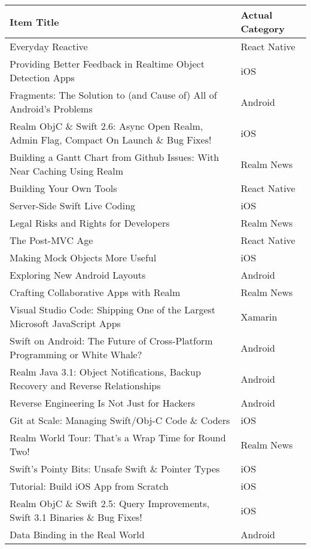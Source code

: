 \documentclass[letterpaper,11pt]{article}
\begin{document}
\clearpage

\begin{table}[h]
\centering
\begin{adjustbox}{max width=\linewidth}
\begin{tabular}{ | l | l |}
\hline
\textbf{Item Title} & \textbf{Actual Category} \\
\hline
Everyday Reactive & React Native \\
Providing Better Feedback in Realtime Object Detection Apps & iOS \\
Fragments: The Solution to (and Cause of) All of Android's Problems & Android \\
Realm ObjC \& Swift 2.6: Async Open Realm, Admin Flag, Compact On Launch \& Bug Fixes! & iOS \\
Building a Gantt Chart from Github Issues: With Near Caching Using Realm & Realm News  \\
Building Your Own Tools & React Native  \\
Server-Side Swift Live Coding & iOS  \\
Legal Risks and Rights for Developers & Realm News  \\
The Post-MVC Age & React Native \\
Making Mock Objects More Useful & iOS \\
Exploring New Android Layouts & Android \\
Crafting Collaborative Apps with Realm & Realm News \\
Visual Studio Code: Shipping One of the Largest Microsoft JavaScript Apps & Xamarin \\
Swift on Android: The Future of Cross-Platform Programming or White Whale? & Android \\
Realm Java 3.1: Object Notifications, Backup Recovery and Reverse Relationships & Android \\
Reverse Engineering Is Not Just for Hackers & Android \\
Git at Scale: Managing Swift/Obj-C Code \& Coders & iOS \\
Realm World Tour: That’s a Wrap Time for Round Two! & Realm News \\
Swift's Pointy Bits: Unsafe Swift \& Pointer Types & iOS  \\
Tutorial: Build iOS App from Scratch & iOS  \\
Realm ObjC \& Swift 2.5: Query Improvements, Swift 3.1 Binaries \& Bug Fixes! & iOS\\
Data Binding in the Real World & Android \\

\end{tabular}
\end{adjustbox}
\end{table}
\end{document}
